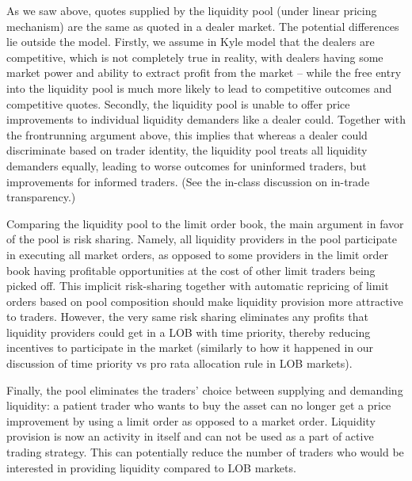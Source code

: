\begin{solution}
	As we saw above, quotes supplied by the liquidity pool (under linear pricing mechanism) are the same as quoted in a dealer market. The potential differences lie outside the model. Firstly, we assume in Kyle model that the dealers are competitive, which is not completely true in reality, with dealers having some market power and ability to extract profit from the market -- while the free entry into the liquidity pool is much more likely to lead to competitive outcomes and competitive quotes. Secondly, the liquidity pool is unable to offer price improvements to individual liquidity demanders like a dealer could. Together with the frontrunning argument above, this implies that whereas a dealer could discriminate based on trader identity, the liquidity pool treats all liquidity demanders equally, leading to worse outcomes for uninformed traders, but improvements for informed traders. (See the in-class discussion on in-trade transparency.)
	
	Comparing the liquidity pool to the limit order book, the main argument in favor of the pool is risk sharing. Namely, all liquidity providers in the pool participate in executing all market orders, as opposed to some providers in the limit order book having profitable opportunities at the cost of other limit traders being picked off. This implicit risk-sharing together with automatic repricing of limit orders based on pool composition should make liquidity provision more attractive to traders. However, the very same risk sharing eliminates any profits that liquidity providers could get in a LOB with time priority, thereby reducing incentives to participate in the market (similarly to how it happened in our discussion of time priority vs pro rata allocation rule in LOB markets).
	
	Finally, the pool eliminates the traders' choice between supplying and demanding liquidity: a patient trader who wants to buy the asset can no longer get a price improvement by using a limit order as opposed to a market order. Liquidity provision is now an activity in itself and can not be used as a part of active trading strategy. This can potentially reduce the number of traders who would be interested in providing liquidity compared to LOB markets.
\end{solution}



\fi






